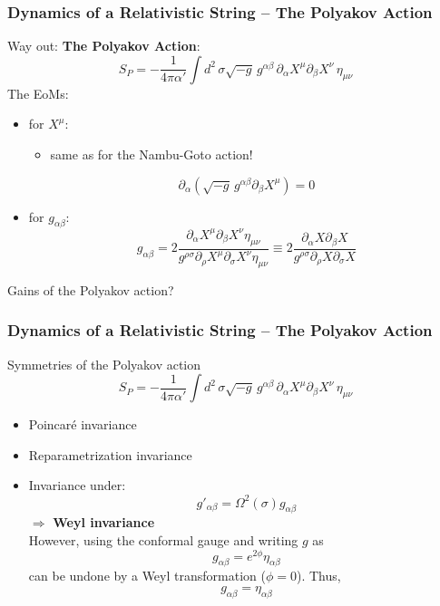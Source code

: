 \documentclass[aspectratio=169]{beamer}
\begin{document}
	\begin{frame}
		\frametitle{Dynamics of a Relativistic String -- The Polyakov Action}
		Way out: \textbf{The Polyakov Action}:
		\begin{equation*}
			S_P = -\frac{1}{4\pi\alpha'}\int d^2 \, \sigma \sqrt{-g} \, g^{\alpha\beta}\,\partial_\alpha X^\mu \partial_\beta X^\nu \, \eta_{\mu\nu}
		\end{equation*}
		The EoMs:
		\begin{itemize}
			\item for $X^\mu$:
			\begin{itemize}
				\item same as for the Nambu-Goto action!
			\end{itemize}
			\begin{equation*}
				\partial_\alpha\left(\sqrt{-g}\,g^{\alpha\beta}\partial_\beta X^{\mu}\right) = 0
			\end{equation*}
			\item for $g_{\alpha\beta}$:
			\begin{equation*}
				g_{\alpha\beta} = 2 \frac{\partial_\alpha X^\mu \partial_\beta X^\nu \eta_{\mu\nu} }{g^{\rho\sigma}\partial_\rho X^\mu \partial_\sigma X^\nu \eta_{\mu\nu}} \equiv 2 \frac{\partial_\alpha X \partial_\beta X}{g^{\rho\sigma}\partial_\rho X \partial_\sigma X}
			\end{equation*}
		\end{itemize}
		Gains of the Polyakov action?
	\end{frame}

	\begin{frame}
		\frametitle{Dynamics of a Relativistic String -- The Polyakov Action}
		Symmetries of the Polyakov action
		\begin{equation*}
			S_P = -\frac{1}{4\pi\alpha'}\int d^2 \, \sigma \sqrt{-g} \, g^{\alpha\beta}\,\partial_\alpha X^\mu \partial_\beta X^\nu \, \eta_{\mu\nu}
		\end{equation*}
		\begin{itemize}
			\item Poincaré invariance
			\item Reparametrization invariance
			\item Invariance under:
			\begin{equation*}
				g'_{\alpha\beta} = \Omega^2(\sigma) g_{\alpha\beta}
			\end{equation*}
			$\Rightarrow$ \textbf{Weyl invariance}\\
			However, using the conformal gauge and writing $g$ as
			\begin{equation*}
				g_{\alpha\beta} = e^{2\phi}\eta_{\alpha\beta}
			\end{equation*}
			can be undone by a Weyl transformation ($\phi=0$). Thus,
			\begin{equation*}
				g_{\alpha\beta} = \eta_{\alpha\beta}
			\end{equation*}
		\end{itemize}
	\end{frame}
\end{document}

